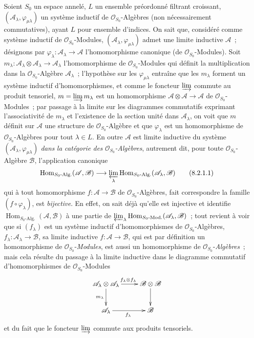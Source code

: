 \begin{env}[8.2.1]
\label{IV.8.2.1-fr}
Soient $S_0$ un espace annelé, $L$ un ensemble préordonné filtrant croissant,
$(\mathscr A_\lambda,\varphi_{\mu\lambda})$ un système inductif de
$\mathcal O_{S_0}$-Algèbres (non nécessairement commutatives), ayant $L$ pour
ensemble d'indices. On sait que, considéré comme système inductif de
$\mathcal O_{S_0}$-Modules, $(\mathscr A_\lambda,\varphi_{\mu\lambda})$ admet
une limite inductive $\mathscr A$~; désignons par
$\varphi_\lambda:\mathscr A_\lambda\to\mathscr A$ l'homomorphisme canonique
(de $\mathcal O_{S_0}$-Modules). Soit
$m_\lambda:\mathscr A_\lambda\otimes\mathscr A_\lambda\to\mathscr A_\lambda$
l'homomorphisme de $\mathcal O_{S_0}$-Modules qui définit la multiplication
dans la $\mathcal O_{S_0}$-Algèbre $\mathscr A_\lambda$~; l'hypothèse sur les
$\varphi_{\mu\lambda}$ entraîne que les $m_\lambda$ forment un système
inductif d'homomorphismes,
et comme le foncteur $\varinjlim$ commute au produit tensoriel,
$m=\varinjlim m_\lambda$ est un homomorphisme
$\mathscr A\otimes\mathscr A\to\mathscr A$ de
$\mathcal O_{S_0}$-Modules~; par passage à la limite sur les diagrammes
commutatifs exprimant l'associativité de $m_\lambda$ et l'existence de la
section unité dans $\mathscr A_\lambda$, on voit que $m$ définit sur
$\mathscr A$ une structure de $\mathcal O_{S_0}$-Algèbre et que
$\varphi_\lambda$ est un homomorphisme de $\mathcal O_{S_0}$-Algèbres pour
tout $\lambda\in L$. En outre $\mathscr A$ est limite inductive du système
$(\mathscr A_\lambda,\varphi_{\mu\lambda})$ \emph{dans la catégorie des
$\mathcal O_{S_0}$-Algèbres}, autrement dit, pour toute
$\mathcal O_{S_0}$-Algèbre $\mathscr B$, l'application canonique
\begin{equation}
\operatorname{Hom}_{S_0\text{-Alg.}}(\mathscr A,\mathscr B)
\longrightarrow
\varprojlim_\lambda
\operatorname{Hom}_{S_0\text{-Alg.}}
(\mathscr A_\lambda,\mathscr B)
\tag{8.2.1.1}\label{IV.8.2.1.1-fr}
\end{equation}
qui à tout homomorphisme $f:\mathscr A\to\mathscr B$ de
$\mathcal O_{S_0}$-Algèbres, fait correspondre la famille
$(f\circ\varphi_\lambda)$, est \emph{bijective}. En effet, on sait déjà
qu'elle est injective et identifie
$\operatorname{Hom}_{S_0\text{-Alg.}}(\mathscr A,\mathscr B)$
à une partie de
$\varprojlim_\lambda
\operatorname{Hom}_{S_0\text{-Mod.}}
(\mathscr A_\lambda,\mathscr B)$~; tout revient à voir que si $(f_\lambda)$
est un système inductif d'homomorphismes de $\mathcal O_{S_0}$-Algèbres,
$f_\lambda:\mathscr A_\lambda\to\mathscr B$, sa limite inductive
$f:\mathscr A\to\mathscr B$, qui est par définition un homomorphisme de
$\mathcal O_{S_0}$-\emph{Modules}, est aussi un homomorphisme de
$\mathcal O_{S_0}$-\emph{Algèbres}~; mais cela résulte du passage à la limite
inductive dans le diagramme commutatif d'homomorphismes de
$\mathcal O_{S_0}$-Modules
\[
\xymatrix{
  \mathscr A_\lambda\otimes\mathscr A_\lambda
    \ar[r]^{f_\lambda\otimes f_\lambda} \ar[d]_{m_\lambda}
    & \mathscr B\otimes\mathscr B \ar[d] \\
  \mathscr A_\lambda \ar[r]_{f_\lambda} & \mathscr B
}
\]
et du fait que le foncteur $\varinjlim$ commute aux produits tensoriels.


\end{env}
